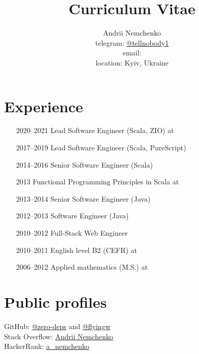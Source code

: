 

\title{Curriculum Vitae}
\author{
  Andrii Nemchenko\\
  telegram: \href{https://t.me/tellnobody1}{@tellnobody1}\\
  email: \\
  location: Kyiv, Ukraine
}
\maketitle

\section{Experience}
\begin{itemize}
  \item[2020–2021] Lead Software Engineer (Scala, ZIO) at 
  \item[2017–2019] Lead Software Engineer (Scala, PureScript)
  \item[2014–2016] Senior Software Engineer (Scala)
  \item[2013] Functional Programming Principles in Scala at 
  \item[2013–2014] Senior Software Engineer (Java)
  \item[2012–2013] Software Engineer (Java)
  \item[2010–2012] Full-Stack Web Engineer
  \item[2010–2011] English level B2 (CEFR) at 
  \item[2006–2012] Applied mathematics (M.S.) at 
\end{itemize}

\section{Public profiles}
GitHub:
\href{https://github.com/zero-deps}{@zero-deps} and
\href{https://github.com/flyingw}{@flyingw} \\
Stack Overflow:
\href{https://stackoverflow.com/users/355491}{Andrii Nemchenko} \\
HackerRank:
\href{https://www.hackerrank.com/a\_nemchenko}{a\_nemchenko}

